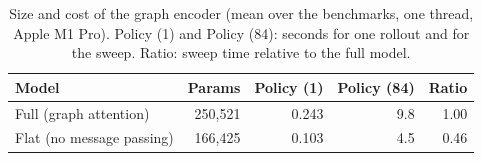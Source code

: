 \begin{table}[htbp]
\centering
\caption{Size and cost of the graph encoder (mean over the benchmarks, one thread, Apple M1 Pro). Policy (1) and Policy (84): seconds for one rollout and for the sweep. Ratio: sweep time relative to the full model.}
\label{tab:graphcost}
\footnotesize
\setlength{\tabcolsep}{3pt}
\begin{tabular}{lrrrr}
\toprule
Model & Params & Policy (1) & Policy (84) & Ratio \\
\midrule
Full (graph attention) & 250{,}521 & 0.243 & 9.8 & 1.00 \\
Flat (no message passing) & 166{,}425 & 0.103 & 4.5 & 0.46 \\
\bottomrule
\end{tabular}
\end{table}
